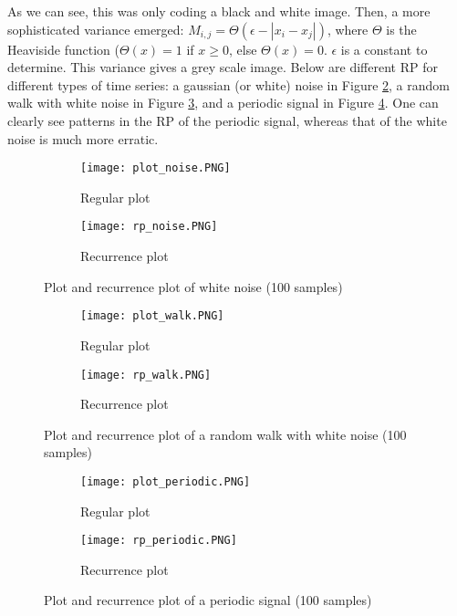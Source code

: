\documentclass[11pt]{article}
\begin{document}
\begin{onehalfspace}
As we can see, this was only coding a black and white image. Then, a more sophisticated variance emerged: $M_{i,j} = \Theta(\epsilon - |x_i - x_j|)$, where $ \Theta $ is the Heaviside function ($\Theta(x) = 1$ if $x \geq 0$, else $\Theta(x) = 0$. $\epsilon$ is a constant to determine. This variance gives a grey scale image. Below are different RP for different types of time series: a gaussian (or white) noise in Figure \ref{fig:white_noise}, a random walk with white noise in Figure \ref{fig:random_walk}, and a periodic signal in Figure \ref{fig:periodic}. One can clearly see patterns in the RP of the periodic signal, whereas that of the white noise is much more erratic.

\begin{figure}[h!]
    \centering
    \captionsetup{justification=centering}
    \begin{subfigure}{0.4\textwidth}
        \texttt{[image: plot\_noise.PNG]}
        \caption{Regular plot}
        \label{fig:}
    \end{subfigure}
    \begin{subfigure}{0.4\textwidth}
        \texttt{[image: rp\_noise.PNG]}
        \caption{Recurrence plot}
    \end{subfigure}
    \caption{Plot and recurrence plot of white noise (100 samples)}
    \label{fig:white_noise}
\end{figure}

\begin{figure}[h!]
    \centering
    \captionsetup{justification=centering}
    \begin{subfigure}{0.4\textwidth}
        \texttt{[image: plot\_walk.PNG]}
        \caption{Regular plot}
    \end{subfigure}
    \begin{subfigure}{0.4\textwidth}
        \texttt{[image: rp\_walk.PNG]}
        \caption{Recurrence plot}
    \end{subfigure}
    \caption{Plot and recurrence plot of a random walk with white noise 
    \label{fig:random_walk}(100 samples)}
\end{figure}

\begin{figure}[h!]
    \centering
    \captionsetup{justification=centering}
    \begin{subfigure}{0.4\textwidth}
        \texttt{[image: plot\_periodic.PNG]}
        \caption{Regular plot}
    \end{subfigure}
    \begin{subfigure}{0.4\textwidth}
        \texttt{[image: rp\_periodic.PNG]}
        \caption{Recurrence plot}
    \end{subfigure}
    \caption{Plot and recurrence plot of a periodic signal (100 samples)}
    \label{fig:periodic}
\end{figure}



\end{onehalfspace}
\end{document}
